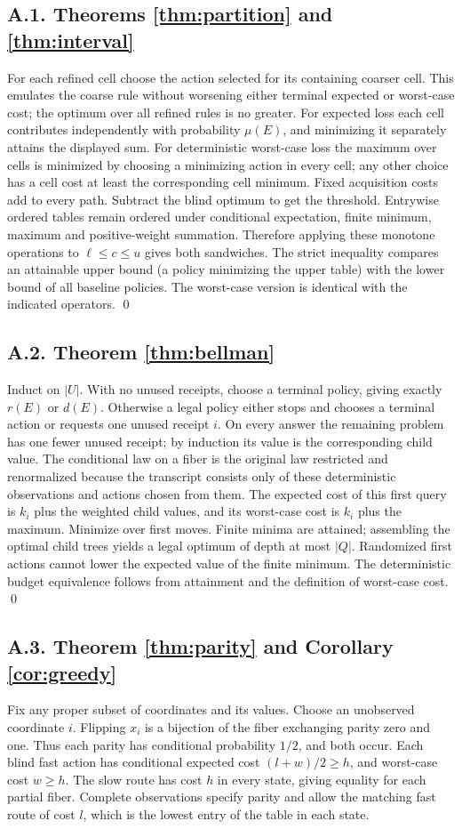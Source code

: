 \documentclass[11pt,letterpaper]{article}
\begin{document}
\subsection*{A.1. Theorems \ref{thm:partition} and \ref{thm:interval}}
For each refined cell choose the action selected for its containing coarser cell. This emulates the coarse rule without worsening either terminal expected or worst-case cost; the optimum over all refined rules is no greater. For expected loss each cell contributes independently with probability $\mu(E)$, and minimizing it separately attains the displayed sum. For deterministic worst-case loss the maximum over cells is minimized by choosing a minimizing action in every cell; any other choice has a cell cost at least the corresponding cell minimum. Fixed acquisition costs add to every path. Subtract the blind optimum to get the threshold. Entrywise ordered tables remain ordered under conditional expectation, finite minimum, maximum and positive-weight summation. Therefore applying these monotone operations to $\ell\le c\le u$ gives both sandwiches. The strict inequality compares an attainable upper bound (a policy minimizing the upper table) with the lower bound of all baseline policies. The worst-case version is identical with the indicated operators. \qed

\subsection*{A.2. Theorem \ref{thm:bellman}}
Induct on $|U|$. With no unused receipts, choose a terminal policy, giving exactly $r(E)$ or $d(E)$. Otherwise a legal policy either stops and chooses a terminal action or requests one unused receipt $i$. On every answer the remaining problem has one fewer unused receipt; by induction its value is the corresponding child value. The conditional law on a fiber is the original law restricted and renormalized because the transcript consists only of these deterministic observations and actions chosen from them. The expected cost of this first query is $k_i$ plus the weighted child values, and its worst-case cost is $k_i$ plus the maximum. Minimize over first moves. Finite minima are attained; assembling the optimal child trees yields a legal optimum of depth at most $|Q|$. Randomized first actions cannot lower the expected value of the finite minimum. The deterministic budget equivalence follows from attainment and the definition of worst-case cost. \qed

\subsection*{A.3. Theorem \ref{thm:parity} and Corollary \ref{cor:greedy}}
Fix any proper subset of coordinates and its values. Choose an unobserved coordinate $i$. Flipping $x_i$ is a bijection of the fiber exchanging parity zero and one. Thus each parity has conditional probability $1/2$, and both occur. Each blind fast action has conditional expected cost $(l+w)/2\ge h$, and worst-case cost $w\ge h$. The slow route has cost $h$ in every state, giving equality for each partial fiber. Complete observations specify parity and allow the matching fast route of cost $l$, which is the lowest entry of the table in each state.
\end{document}
